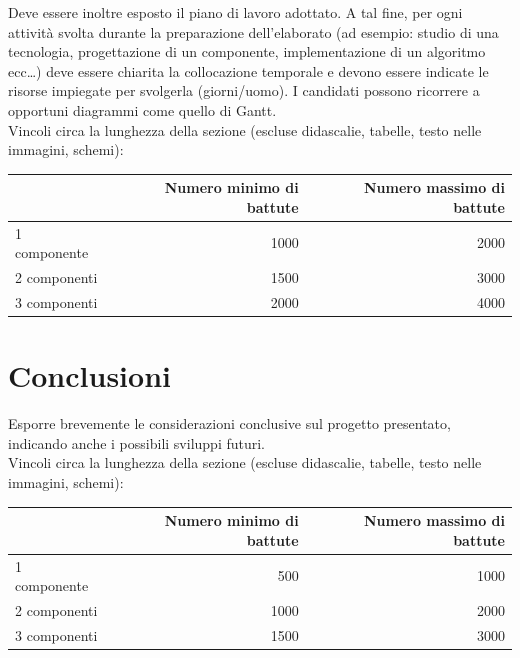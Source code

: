 \documentclass[12pt]{article}
\begin{document}
Deve essere inoltre esposto il piano di lavoro adottato. A tal fine, per ogni attività svolta durante la preparazione dell'elaborato (ad esempio: studio di una tecnologia, progettazione di un componente, implementazione di un algoritmo ecc…) deve essere chiarita la collocazione temporale e devono essere indicate le risorse impiegate per svolgerla (giorni/uomo). I candidati possono ricorrere a opportuni diagrammi come quello di Gantt.\\


Vincoli circa la lunghezza della sezione (escluse didascalie, tabelle, testo nelle immagini, schemi):

\vspace{1cm}
\begin{tabular}{l|rr}
 & Numero minimo di battute & Numero massimo di battute \\
 \hline
 1 componente & 1000 & 2000 \\
 2 componenti & 1500 & 3000 \\
 3 componenti & 2000 & 4000 \\
 \hline
\end{tabular}

\newpage



\section{Conclusioni}

Esporre brevemente le considerazioni conclusive sul progetto presentato, indicando anche i possibili sviluppi futuri.\\

Vincoli circa la lunghezza della sezione (escluse didascalie, tabelle, testo nelle immagini, schemi):

\vspace{1cm}
\begin{tabular}{l|rr}
 & Numero minimo di battute & Numero massimo di battute \\
 \hline
 1 componente & 500 & 1000 \\
 2 componenti & 1000 & 2000 \\
 3 componenti & 1500 & 3000 \\
 \hline
\end{tabular}

\newpage
\end{document}
